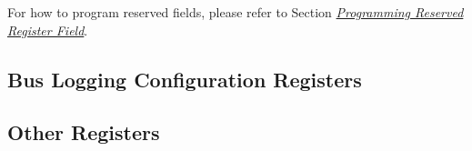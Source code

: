 \documentclass[main\_\_EN.tex]{subfiles}
\begin{document}
For how to program reserved fields, please refer to Section \hyperref[programming-reserved-field]{\textit{Programming Reserved Register Field}}.

\subsection{Bus Logging Configuration Registers}
\label{sec:dbgassist-mem-monitor-reg}



\subsection{Other Registers}
\label{sec:dbgassist-bus-monitor-reg}


\end{document}

